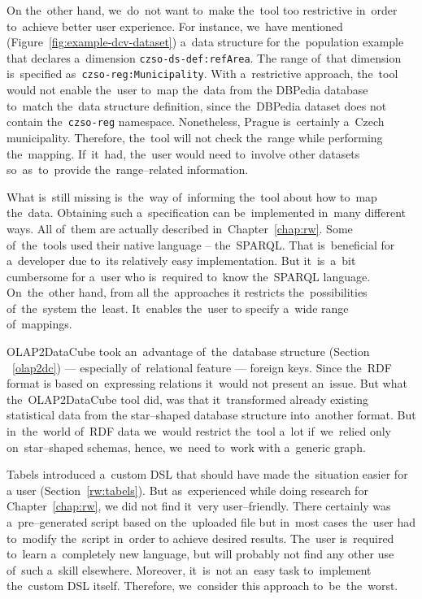 \begin{sloppypar}
On the~other hand, we~do~not want to~make the~tool too restrictive in~order to~achieve better user experience. For instance, we~have mentioned
(Figure~\ref{fig:example-dcv-dataset}) a~data structure 
for the~population example that declares a~dimension \texttt{czso-ds-def:refArea}. 
The range of~that dimension is~specified as~\texttt{czso-reg:Municipality}. 
With a~restrictive approach, the~tool would not enable the~user to~map the~data from 
the DBPedia database to~match the~data structure definition, since the~DBPedia 
dataset does not contain the~\texttt{czso-reg} namespace. Nonetheless, Prague is~certainly a~Czech municipality. Therefore, the~tool will not check the~range 
while performing the~mapping. If~it~had, the~user would need to~involve 
other datasets so~as~to~provide the~range--related information.
\end{sloppypar}

What is~still missing is~the~way of~informing the~tool about how to~map the~data.
Obtaining such a~specification can be~implemented in~many different ways. 
All of~them are actually described in~Chapter~\ref{chap:rw}. Some of~the~tools used 
their native language -- the~SPARQL. That is~beneficial for a~developer due to~its relatively easy implementation. But it~is~a~bit cumbersome for a~user 
who is~required to~know the~SPARQL language. On~the~other hand, from all the~approaches
it restricts the~possibilities of~the~system the~least. It~enables the~user 
to specify a~wide range of~mappings.

OLAP2DataCube took an~advantage of~the~database structure (Section ~\ref{olap2dc}) --- 
especially of~relational feature --- foreign keys. Since the~RDF format 
is based on~expressing relations it~would not present an~issue. But what the~OLAP2DataCube tool did, was that it~transformed already existing statistical data from
the star--shaped database structure into~another format. But in~the~world of~RDF 
data we~would restrict the~tool a~lot if~we~relied only on~star--shaped 
schemas, hence, we~need to~work with a~generic graph.

Tabels introduced a~custom DSL that should have made the~situation easier for 
a user (Section~\ref{rw:tabels}). But as~experienced while doing research for Chapter~\ref{chap:rw}, 
we did not find it~very user--friendly. There certainly was a~pre--generated script based
on the~uploaded file but in~most cases the~user had to~modify the~script in~order to
achieve desired results. The~user is~required to~learn a~completely new language, but will probably not find any other use of~such a~skill
elsewhere. Moreover, it~is~not an~easy task to~implement the~custom DSL itself. Therefore, we~consider this approach to~be~the~worst.


